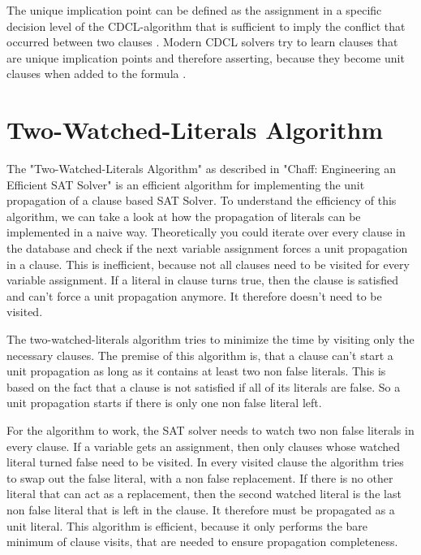The unique implication point can be defined as the assignment in a specific decision level of the CDCL-algorithm that is sufficient to imply the conflict that occurred between two clauses \cite{biere2009handbook}. Modern CDCL solvers try to learn clauses that are unique implication points and therefore asserting, because they become unit clauses when added to the formula \cite{biere2009handbook}.

\section{Two-Watched-Literals Algorithm}
\label{sec:twoWatchedLiterals}

The "Two-Watched-Literals Algorithm" as described in "Chaff: Engineering an Efficient SAT Solver" \cite{moskewicz2001chaff} is an efficient algorithm for implementing the unit propagation of a clause based SAT Solver. To understand the efficiency of this algorithm, we can take a look at how the propagation of literals can be implemented in a naive way. Theoretically you could iterate over every clause in the database and check if the next variable assignment forces a unit propagation in a clause. This is inefficient, because not all clauses need to be visited for every variable assignment. If a literal in clause turns true, then the clause is satisfied and can't force a unit propagation anymore. It therefore doesn't need to be visited.

The two-watched-literals algorithm tries to minimize the time by visiting only the necessary clauses. The premise of this algorithm is, that a clause can't start a unit propagation as long as it contains at least two non false literals. This is based on the fact that a clause is not satisfied if all of its literals are false. So a unit propagation starts if there is only one non false literal left.

For the algorithm to work, the SAT solver needs to watch two non false literals in every clause. If a variable gets an assignment, then only clauses whose watched literal turned false need to be visited. In every visited clause the algorithm tries to swap out the false literal, with a non false replacement. If there is no other literal that can act as a replacement, then the second watched literal is the last non false literal that is left in the clause. It therefore must be propagated as a unit literal. This algorithm is efficient, because it only performs the bare minimum of clause visits, that are needed to ensure propagation completeness.

